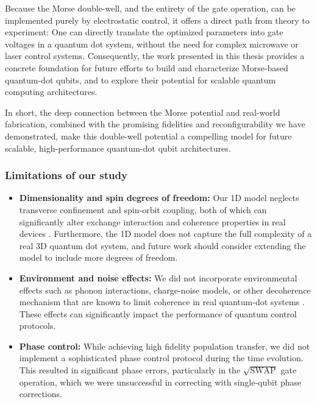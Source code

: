 \documentclass{subfiles}
\begin{document}
Because the Morse double-well, and the entirety of the gate operation, can be implemented purely by electrostatic control, it offers a direct path from theory to experiment: One can directly translate the optimized parameters into gate voltages in a quantum dot system, without the need for complex microwave or laser control systems. Consequently, the work presented in this thesis provides a concrete foundation for future efforts to build and characterize Morse-based quantum-dot qubits, and to explore their potential for scalable quantum computing architectures. 

In short, the deep connection between the Morse potential and real-world fabrication, combined with the promising fidelities and reconfigurability we have demonstrated, make this double-well potential a compelling model for future scalable, high-performance quantum-dot qubit architectures. 

\subsubsection*{Limitations of our study}
\begin{itemize}
    \item \textbf{Dimensionality and spin degrees of freedom:} Our 1D model neglects transverse confinement and spin-orbit coupling, both of which can significantly alter exchange interaction and coherence properties in real devices \cite{kuhlmann2013charge, yoneda2018quantum}. Furthermore, the 1D model does not capture the full complexity of a real 3D quantum dot system, and future work should consider extending the model to include more degrees of freedom.
    \item \textbf{Environment and noise effects:} We did not incorporate environmental effects such as phonon interactions, charge-noise models, or other decoherence mechanism that are known to limit coherence in real quantum-dot systems \cite{jacak2013quantum, nielsen2010quantum}. These effects can significantly impact the performance of quantum control protocols.
    \item \textbf{Phase control:} While achieving high fidelity population transfer, we did not implement a sophisticated phase control protocol during the time evolution. This resulted in significant phase errors, particularly in the $\sqrt{\text{SWAP}}$ gate operation, which we were unsuccessful in correcting with single-qubit phase corrections. 
\end{itemize}
\end{document}
